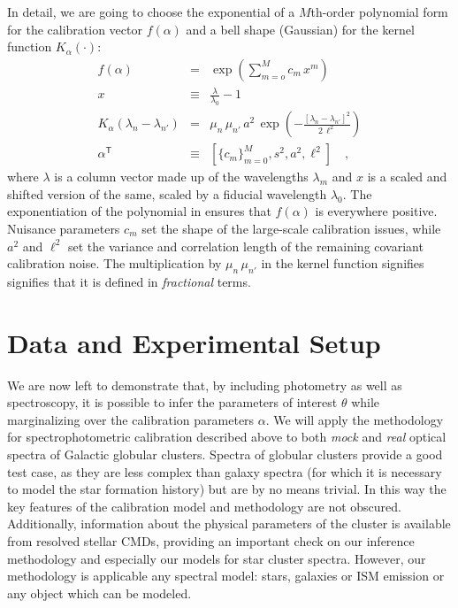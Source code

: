 \documentclass[iop,numberedappendix]{emulateapj}
\newcommand{\transpose}[1]{{#1}^{\!\mathsf T}}
\begin{document}
In detail, we are going to choose the exponential of a $M$th-order
polynomial form for the calibration vector $f(\alpha)$ and a bell
shape (Gaussian) for the kernel function $K_\alpha(\cdot)$:
\begin{eqnarray}\displaystyle
f(\alpha) &=& \exp\left(\sum_{m=o}^M c_m\,x^m\right)
\\
x &\equiv& \frac{\lambda}{\lambda_0} - 1
\\
K_\alpha(\lambda_n - \lambda_{n'}) &=& \mu_n\,\mu_{n'}\, a^2\,\exp\left(-\frac{[\lambda_n - \lambda_{n'}]^2}{2\,\ell^2}\right)
\\
\transpose{\alpha} &\equiv& \left[ \{c_m\}_{m=0}^M, s^2, a^2, \ell^2 \right]
\quad ,
\end{eqnarray}
where $\lambda$ is a column vector made up of the wavelengths
$\lambda_m$ and $x$ is a scaled and shifted version of the same,
scaled by a fiducial wavelength $\lambda_0$.  The exponentiation of
the polynomial in ensures that $f(\alpha)$ is everywhere positive.
Nuisance parameters $c_m$ set the shape of the large-scale calibration
issues, while $a^2$ and $\ell^2$ set the variance and correlation
length of the remaining covariant calibration noise. The
multiplication by $\mu_n\, \mu_{n'}$ in the kernel function signifies
signifies that it is defined in \emph{fractional} terms.



\section{Data and Experimental Setup}

We are now left to demonstrate that, by including photometry as well
as spectroscopy, it is possible to infer the parameters of interest
$\theta$ while marginalizing over the calibration parameters $\alpha$.
We will apply the methodology for spectrophotometric calibration
described above to both \emph{mock} and \emph{real} optical spectra of
Galactic globular clusters.  Spectra of globular clusters provide a
good test case, as they are less complex than galaxy spectra (for
which it is necessary to model the star formation history) but are by
no means trivial. In this way the key features of the calibration
model and methodology are not obscured.  Additionally, information
about the physical parameters of the cluster is available from
resolved stellar CMDs, providing an important check on our inference
methodology and especially our models for star cluster spectra.  However,
our methodology is applicable any spectral model: stars, galaxies or
ISM emission or any object which can be modeled.
\end{document}
